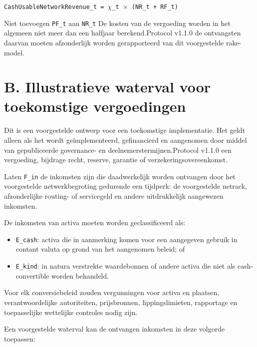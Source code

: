 \documentclass[11pt]{article}
\begin{document}
\texttt{CashUsableNetworkRevenue\_t = $\chi$\_t $\times$ (NR\_t + RF\_t)}

Niet toevoegen \texttt{PF\_t} aan \texttt{NR\_t} De kosten van de vergoeding worden in het algemeen niet meer dan een halfjaar berekend.Protocol v1.1.0 de ontvangsten daarvan moeten afzonderlijk worden gerapporteerd van dit voorgestelde rake-model.


\section*{B. Illustratieve waterval voor toekomstige vergoedingen}

Dit is een voorgestelde ontwerp voor een toekomstige implementatie. Het geldt alleen als het wordt geïmplementeerd, gefinancierd en aangenomen door middel van gepubliceerde governance- en deelnemerstermijnen.Protocol v1.1.0 een vergoeding, bijdrage recht, reserve, garantie of verzekeringsovereenkomst.

Laten \texttt{F\_in} de inkomsten zijn die daadwerkelijk worden ontvangen door het voorgestelde netwerkbegroting gedurende een tijdperk: de voorgestelde netrack, afzonderlijke routing- of servicegeld en andere uitdrukkelijk aangewezen inkomsten.

De inkomsten van activa moeten worden geclassificeerd als:

\begin{itemize}[leftmargin=*]
\item \texttt{E\_cash}: activa die in aanmerking komen voor een aangegeven gebruik in contant valuta op grond van het aangenomen beleid; of
\item \texttt{E\_kind}: in natura verstrekte waardebonnen of andere activa die niet als cash-convertible worden behandeld.
\end{itemize}
Voor elk conversiebeleid zouden vergunningen voor activa en plaatsen, verantwoordelijke autoriteiten, prijsbronnen, lippingslimieten, rapportage en toepasselijke wettelijke controles nodig zijn.

Een voorgestelde waterval kan de ontvangen inkomsten in deze volgorde toepassen:
\end{document}
